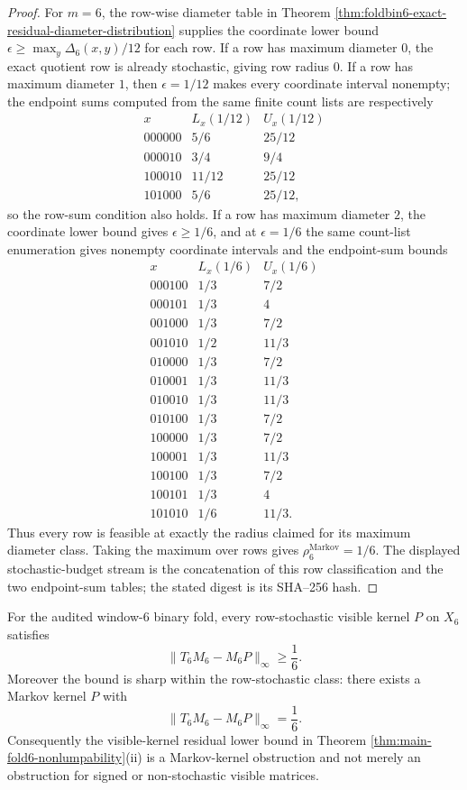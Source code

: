 \begin{proof}
For \(m=6\), the row-wise diameter table in Theorem \ref{thm:foldbin6-exact-residual-diameter-distribution} supplies the coordinate lower bound \(\epsilon\ge\max_y\Delta_6(x,y)/12\) for each row.  If a row has maximum diameter \(0\), the exact quotient row is already stochastic, giving row radius \(0\).  If a row has maximum diameter \(1\), then \(\epsilon=1/12\) makes every coordinate interval nonempty; the endpoint sums computed from the same finite count lists are respectively
\[
\begin{array}{c|cc}
x&L_x(1/12)&U_x(1/12)\\ \hline
000000&5/6&25/12\\
000010&3/4&9/4\\
100010&11/12&25/12\\
101000&5/6&25/12,
\end{array}
\]
so the row-sum condition also holds.  If a row has maximum diameter \(2\), the coordinate lower bound gives \(\epsilon\ge1/6\), and at \(
\epsilon=1/6\) the same count-list enumeration gives nonempty coordinate intervals and the endpoint-sum bounds
\[
\begin{array}{c|cc}
x&L_x(1/6)&U_x(1/6)\\ \hline
000100&1/3&7/2\\
000101&1/3&4\\
001000&1/3&7/2\\
001010&1/2&11/3\\
010000&1/3&7/2\\
010001&1/3&11/3\\
010010&1/3&11/3\\
010100&1/3&7/2\\
100000&1/3&7/2\\
100001&1/3&11/3\\
100100&1/3&7/2\\
100101&1/3&4\\
101010&1/6&11/3.
\end{array}
\]
Thus every row is feasible at exactly the radius claimed for its maximum diameter class.  Taking the maximum over rows gives \(\rho_6^{\mathrm{Markov}}=1/6\).  The displayed stochastic-budget stream is the concatenation of this row classification and the two endpoint-sum tables; the stated digest is its SHA--256 hash. \qedhere
\end{proof}

\begin{corollary}\label{cor:foldbin6-visible-markov-lower-bound}
For the audited window-\(6\) binary fold, every row-stochastic visible kernel \(P\) on \(X_6\) satisfies
\[
\|T_6M_6-M_6P\|_\infty\ge \frac16.
\]
Moreover the bound is sharp within the row-stochastic class: there exists a Markov kernel \(P\) with
\[
\|T_6M_6-M_6P\|_\infty= \frac16.
\]
Consequently the visible-kernel residual lower bound in Theorem \ref{thm:main-fold6-nonlumpability}\textup{(ii)} is a Markov-kernel obstruction and not merely an obstruction for signed or non-stochastic visible matrices.
\end{corollary}


